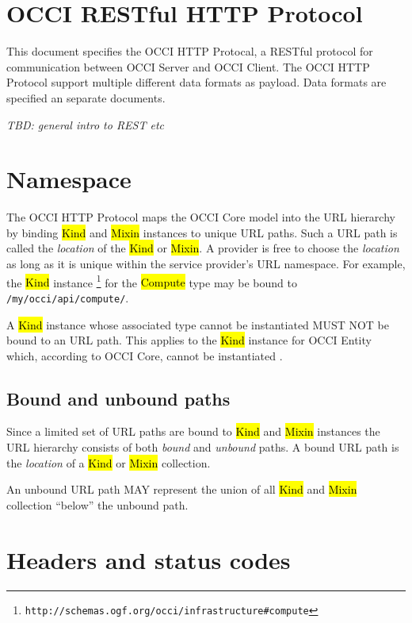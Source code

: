 \documentclass[10pt,a4paper]{article}
\begin{document}
\section{OCCI RESTful HTTP Protocol}

This document specifies the OCCI HTTP Protocal, a RESTful protocol for
communication between OCCI Server and OCCI Client. The OCCI HTTP Protocol
support multiple different data formats as payload. Data formats are specified
an separate documents.

{\em TBD: general intro to REST etc}

\section{Namespace}

The OCCI HTTP Protocol maps the OCCI Core model into the URL hierarchy by binding
\hl{Kind} and \hl{Mixin} instances to unique URL paths. Such a URL path is called
the {\em location} of the \hl{Kind} or \hl{Mixin}.
A provider is free to choose the {\em location} as long as it is unique
within the service provider's URL namespace.
For example, the \hl{Kind} instance%
\footnote{\tt http://schemas.ogf.org/occi/infrastructure\#compute}
for the \hl{Compute} type may be bound to {\tt /my/occi/api/compute/}.

A \hl{Kind} instance whose associated type cannot be instantiated MUST NOT be
bound to an URL path. This applies to the \hl{Kind} instance for OCCI Entity
which, according to OCCI Core, cannot be instantiated \cite{occi:core}.


\subsection{Bound and unbound paths}

Since a limited set of URL paths are bound to \hl{Kind} and \hl{Mixin}
instances the URL hierarchy consists of both {\em bound} and {\em unbound}
paths.
A bound URL path is the {\em location} of a \hl{Kind} or \hl{Mixin} collection.

An unbound URL path MAY represent the union of all \hl{Kind} and \hl{Mixin}
collection ``below'' the unbound path.

\section{Headers and status codes}
\end{document}
